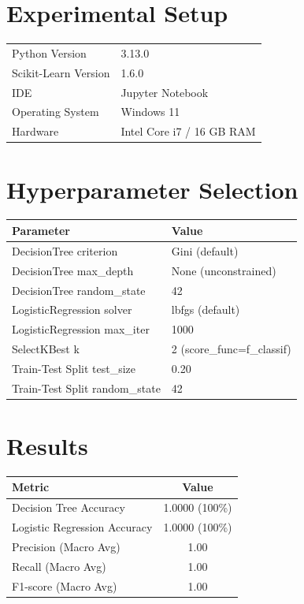 \documentclass[12pt,a4paper]{article}
\begin{document}
\section{Experimental Setup}

\begin{tabular}{ll}
\toprule
Python Version & 3.13.0 \\
Scikit-Learn Version & 1.6.0 \\
IDE & Jupyter Notebook \\
Operating System & Windows 11 \\
Hardware & Intel Core i7 / 16 GB RAM \\
\bottomrule
\end{tabular}

\section{Hyperparameter Selection}

\begin{tabular}{ll}
\toprule
Parameter & Value\\
\midrule
DecisionTree criterion & Gini (default) \\
DecisionTree max\_depth & None (unconstrained) \\
DecisionTree random\_state & 42 \\
LogisticRegression solver & lbfgs (default) \\
LogisticRegression max\_iter & 1000 \\
SelectKBest k & 2 (score\_func=f\_classif) \\
Train-Test Split test\_size & 0.20 \\
Train-Test Split random\_state & 42 \\
\bottomrule
\end{tabular}

\section{Results}

\begin{tabular}{lc}
\toprule
Metric & Value\\
\midrule
Decision Tree Accuracy & 1.0000 (100\%) \\
Logistic Regression Accuracy & 1.0000 (100\%) \\
Precision (Macro Avg) & 1.00 \\
Recall (Macro Avg) & 1.00 \\
F1-score (Macro Avg) & 1.00 \\
\bottomrule
\end{tabular}
\end{document}
